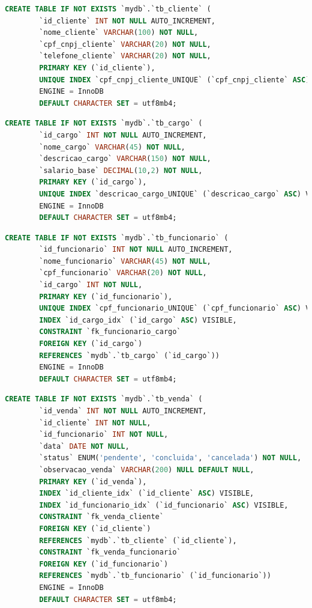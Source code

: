 \documentclass[
12pt,
a4paper,
semrecuonosumario,
sumario = abnt-6027-2012]{report}
\begin{document}
    \begin{lstlisting}[language=SQL,caption={DDL -- Tabela \texttt{tb\_cliente}}]
		CREATE TABLE IF NOT EXISTS `mydb`.`tb_cliente` (
		`id_cliente` INT NOT NULL AUTO_INCREMENT,
		`nome_cliente` VARCHAR(100) NOT NULL,
		`cpf_cnpj_cliente` VARCHAR(20) NOT NULL,
		`telefone_cliente` VARCHAR(20) NOT NULL,
		PRIMARY KEY (`id_cliente`),
		UNIQUE INDEX `cpf_cnpj_cliente_UNIQUE` (`cpf_cnpj_cliente` ASC) VISIBLE)
		ENGINE = InnoDB
		DEFAULT CHARACTER SET = utf8mb4;
    \end{lstlisting}
    \begin{lstlisting}[language=SQL,caption={DDL -- Tabela \texttt{tb\_cargo}}]
		CREATE TABLE IF NOT EXISTS `mydb`.`tb_cargo` (
		`id_cargo` INT NOT NULL AUTO_INCREMENT,
		`nome_cargo` VARCHAR(45) NOT NULL,
		`descricao_cargo` VARCHAR(150) NOT NULL,
		`salario_base` DECIMAL(10,2) NOT NULL,
		PRIMARY KEY (`id_cargo`),
		UNIQUE INDEX `descricao_cargo_UNIQUE` (`descricao_cargo` ASC) VISIBLE)
		ENGINE = InnoDB
		DEFAULT CHARACTER SET = utf8mb4;
    \end{lstlisting}
    \begin{lstlisting}[language=SQL,caption={DDL -- Tabela \texttt{tb\_funcionario}}]
		CREATE TABLE IF NOT EXISTS `mydb`.`tb_funcionario` (
		`id_funcionario` INT NOT NULL AUTO_INCREMENT,
		`nome_funcionario` VARCHAR(45) NOT NULL,
		`cpf_funcionario` VARCHAR(20) NOT NULL,
		`id_cargo` INT NOT NULL,
		PRIMARY KEY (`id_funcionario`),
		UNIQUE INDEX `cpf_funcionario_UNIQUE` (`cpf_funcionario` ASC) VISIBLE,
		INDEX `id_cargo_idx` (`id_cargo` ASC) VISIBLE,
		CONSTRAINT `fk_funcionario_cargo`
		FOREIGN KEY (`id_cargo`)
		REFERENCES `mydb`.`tb_cargo` (`id_cargo`))
		ENGINE = InnoDB
		DEFAULT CHARACTER SET = utf8mb4;
    \end{lstlisting}
    \begin{lstlisting}[language=SQL,caption={DDL -- Tabela \texttt{tb\_venda}}]
		CREATE TABLE IF NOT EXISTS `mydb`.`tb_venda` (
		`id_venda` INT NOT NULL AUTO_INCREMENT,
		`id_cliente` INT NOT NULL,
		`id_funcionario` INT NOT NULL,
		`data` DATE NOT NULL,
		`status` ENUM('pendente', 'concluida', 'cancelada') NOT NULL,
		`observacao_venda` VARCHAR(200) NULL DEFAULT NULL,
		PRIMARY KEY (`id_venda`),
		INDEX `id_cliente_idx` (`id_cliente` ASC) VISIBLE,
		INDEX `id_funcionario_idx` (`id_funcionario` ASC) VISIBLE,
		CONSTRAINT `fk_venda_cliente`
		FOREIGN KEY (`id_cliente`)
		REFERENCES `mydb`.`tb_cliente` (`id_cliente`),
		CONSTRAINT `fk_venda_funcionario`
		FOREIGN KEY (`id_funcionario`)
		REFERENCES `mydb`.`tb_funcionario` (`id_funcionario`))
		ENGINE = InnoDB
		DEFAULT CHARACTER SET = utf8mb4;
    \end{lstlisting}
\end{document}
